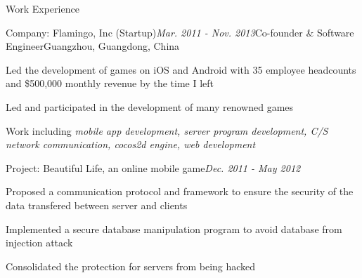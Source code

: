 \documentclass{resume} %
\begin{document}
\begin{rSection}{Work Experience}

\begin{rSubsection}{Company: Flamingo, Inc (Startup)}{\em Mar. 2011 - Nov. 2013}{Co-founder \& Software Engineer}{Guangzhou, Guangdong, China}
\item Led the development of games on iOS and Android with 35 employee headcounts and \$500,000 monthly revenue by the time I left
\item Led and participated in the development of many renowned games
\item Work including \textit{mobile app development, server program development, C/S network communication, cocos2d engine, web development}
\end{rSubsection}


\begin{rSubsection}{Project: Beautiful Life, an online mobile game}{\em Dec. 2011 - May 2012}{}{}
\item Proposed a communication protocol and framework to ensure the security of the data transfered between server and clients
\item Implemented a secure database manipulation program to avoid database from injection attack
\item Consolidated the protection for servers from being hacked
\end{rSubsection}


\end{rSection}











\end{document}
